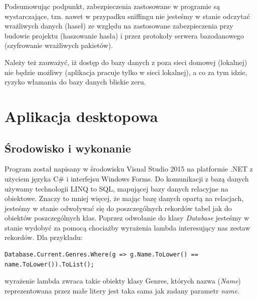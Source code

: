 \documentclass{article}
\begin{document}
Podsumowując podpunkt, zabezpieczenia zastosowane w programie są wystarczające, tzn. nawet w przypadku sniffingu nie jesteśmy w stanie odczytać wrażliwych danych (haseł) ze względu na zastosowane zabezpieczenia przy budowie projektu (haszowanie hasła) i przez protokoły serwera bazodanowego (szyfrowanie wrażliwych pakietów).

Należy też zauważyć, iż dostęp do bazy danych z poza sieci domowej (lokalnej) nie będzie możliwy (aplikacja pracuje tylko w sieci lokalnej), a co za tym idzie, ryzyko włamania do bazy danych bliskie zeru.
\section{Aplikacja desktopowa}
\subsection{Środowisko i wykonanie}
Program został napisany w środowisku Visual Studio 2015 na platformie .NET z użyciem języka C\# i interfejsu Windows Forms. Do komunikacji z bazą danych używamy technologii LINQ to SQL, mapującej bazy danych relacyjne na obiektowe. Znaczy to mniej więcej, że mając bazę danych opartą na relacjach, jesteśmy w stanie odwoływać się do poszczególnych rekordów tabel jak do obiektów poszczególnych klas. Poprzez odwołanie do klasy \textit{Database} jesteśmy w stanie wydobyć za pomocą chociażby wyrażenia lambda interesujący nas zestaw rekordów. Dla przykładu:
\begin{verbatim}
Database.Current.Genres.Where(g => g.Name.ToLower() == name.ToLower()).ToList();
\end{verbatim}
wyrażenie lambda zwraca takie obiekty klasy Genres, których nazwa (\textit{Name}) reprezentowana przez małe litery jest taka sama jak zadany parametr \textit{name}.
\end{document}
